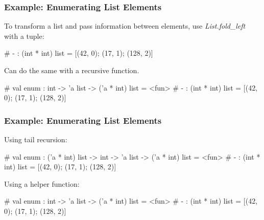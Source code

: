 \documentclass{plt}
\begin{document}
\begin{frame}[fragile]
  \frametitle{Example: Enumerating List Elements}

To transform a list and pass information between elements, use
\emph{List.fold\_left} with a tuple:

\begin{interactive}
# 
- : (int * int) list = [(42, 0); (17, 1); (128, 2)]
\end{interactive}
Can do the same
with a recursive function.

\begin{interactive}
# 
val enum : int -> 'a list -> ('a * int) list = <fun>
# 
- : (int * int) list = [(42, 0); (17, 1); (128, 2)]
\end{interactive}

\end{frame}

\begin{frame}[fragile]
  \frametitle{Example: Enumerating List Elements}

Using tail recursion:

\begin{interactive}
# 
val enum : ('a * int) list -> int -> 'a list -> ('a * int) list = <fun>
# 
- : (int * int) list = [(42, 0); (17, 1); (128, 2)]
\end{interactive}
Using a \alert{helper} function:

\begin{interactive}
# 
val enum : int -> 'a list -> ('a * int) list = <fun>
# 
- : (int * int) list = [(42, 0); (17, 1); (128, 2)]
\end{interactive}

\end{frame}
\end{document}
